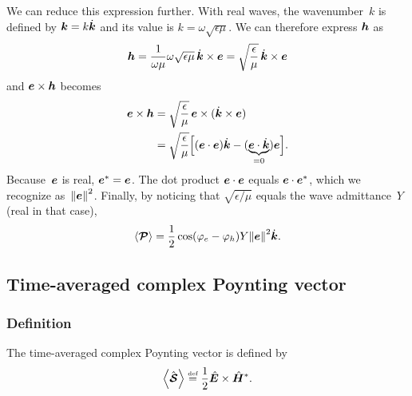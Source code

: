 We can reduce this expression further.
With real waves, the wavenumber~$k$ is defined by $\bm{k} = k \dot{\bm{k}}$ and its value is $k=\omega \sqrt{\epsilon \mu}$.
We can therefore express $\bm{h}$ as
\begin{equation}
    \bm{h}
    = \frac{1}{\omega \mu} \omega \sqrt{\epsilon \mu} \, \dot{\bm{k}} \times \bm{e}
    = \sqrt{\frac{\epsilon}{\mu}} \, \dot{\bm{k}} \times \bm{e}
\end{equation}
and $\bm{e} \times \bm{h}$ becomes
\begin{subequations}
    \begin{align}
        \bm{e} \times \bm{h}
        &=
        \sqrt{\frac{\epsilon}{\mu}} \, \bm{e} \times (\dot{\bm{k}} \times \bm{e})
        \\
        &=
        \sqrt{\frac{\epsilon}{\mu}}
        \Big[
            (\bm{e} \cdot \bm{e})\dot{\bm{k}}
            -
            (
                \underbrace{\bm{e} \cdot \dot{\bm{k}}}_{=0}
            )\bm{e}
        \Big]
        \text{.}
    \end{align}
\end{subequations}
Because~$\bm{e}$ is real, $\bm{e}^*=\bm{e}$.
The dot product $\bm{e}\cdot\bm{e}$ equals $\bm{e}\cdot\bm{e}^*$, which we recognize as~$\norm{\vect{e}}^2$.
Finally, by noticing that $\sqrt{\epsilon/\mu}$ equals the wave admittance~$Y$ (real in that case),
\begin{equation}
    \Timeavg{\vect{\power{P}}}
    =
    \frac{1}{2} \cos(\varphi_e - \varphi_h) 
    Y %
    \norm{\vect{e}}^2
    \vectu{k}
    \text{.}
    \label{eq:poynting_real}
\end{equation}





\subsection{Time-averaged complex Poynting vector}
\label{sec:time_averaged_complex_poynting_vector}




\subsubsection{Definition}
The time-averaged complex Poynting vector is defined by
\begin{equation}
    \Timeavg{\vectcp{\power{S}}}
    \equaldef
    \frac{1}{2} \vectcp{E} \times \vectcp{H}^*
    \text{.}
    \label{eq:poynting_complex_def}
\end{equation}



